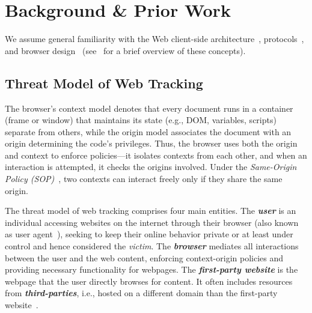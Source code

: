 \section{Background \& Prior Work}

We assume general familiarity with the Web client-side architecture~\cite{shklarWebApplicationArchitecture2009}, protocols~\cite{HighPerformanceBrowsera}, and browser design~\cite{WebTechnologyDevelopers2025} (see~ for a brief overview of these concepts).

\subsection{Threat Model of Web Tracking}
\label{sec:threat-model}

The browser's context model denotes that every document runs in a container (frame or window) that maintains its state (e.g., DOM, variables, scripts) separate from others, while the origin model associates the document with an origin determining the code’s privileges.
%
Thus, the browser uses both the origin and context to enforce policies---it isolates contexts from each other, and when an interaction is attempted, it checks the origins involved.
%
Under the \textit{Same-Origin Policy (SOP)}~\cite{mdnSameoriginPolicySecurity2024}, two contexts can interact freely only if they share the same origin.

The threat model of web tracking comprises four main entities.
%
The \textbf{\textit{user}} is an individual accessing websites on the internet through their browser (also known as user agent~\cite{mdnUserAgentMDN2025}), seeking to keep their online behavior private or at least under control and hence considered the \textit{victim}.
%
The \textbf{\textit{browser}} mediates all interactions between the user and the web content, enforcing context-origin policies and providing necessary functionality for webpages.
%
The \textbf{\textit{first-party website}} is the webpage that the user directly browses for content.
%
It often includes resources from \textbf{\textit{third-parties}}, i.e., hosted on a different domain than the first-party website~\cite{mdnDomainMDNWeb2024}.


